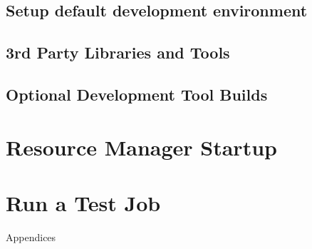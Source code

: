 \documentclass[letterpaper]{article}
\begin{document}
\subsection{Setup default development environment}


\subsection{3rd Party Libraries and Tools} \label{sec:3rdparty}



\vspace*{0.1cm}


\subsection{Optional Development Tool Builds} \label{sec:3rdparty_intel}


\section{Resource Manager Startup} \label{sec:rms_startup}


\section{Run a Test Job} \label{sec:test_job}


\clearpage
\appendix
{\bf \LARGE \centerline{Appendices}} \vspace*{0.2cm}

\renewcommand{\thesubsection}{\Alph{subsection}}







\end{document}
